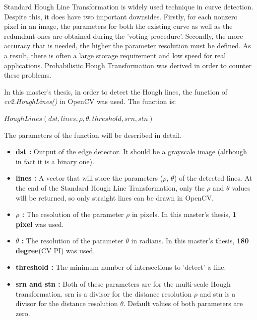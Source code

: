 Standard Hough Line Transformation is widely used technique in curve detection. Despite this, it does have two important downsides. Firstly, for each nonzero pixel in an image, the parameters for both the existing curve as well as the redundant ones are obtained during the 'voting procedure'. Secondly, the more accuracy that is needed, the higher the parameter resolution must be defined. As a result, there is often a large storage requirement and low speed for real applications. Probabilistic Hough Transformation was derived in order to counter these problems. 

In this master's thesis, in order to detect the Hough lines, the function of \textit{cv2.HoughLines()} in OpenCV was used. The function is:

  \begin{center}
  
$HoughLines(dst, lines, \rho, \theta, threshold, srn, stn )  $

  \end{center}

The parameters of the function will be described in detail.\cite{Standard_Hough_Transformation2}
 
\begin{itemize}

\item \textbf{dst : }Output of the edge detector. It should be a grayscale image (although in fact it is a binary one).
 
\item \textbf{lines : }A vector that will store the parameters ($ \rho $, $ \theta $) of the detected lines. At the end of the Standard Hough Line Transformation, only the $ \rho $ and $ \theta $ values will be returned, so only straight lines can be drawn in OpenCV.

\item \textbf{$ \rho $ : }The resolution of the parameter $ \rho $ in pixels. In this master's thesis, \textbf{1 pixel} was used.

\item \textbf{$ \theta $ : }The resolution of the parameter $ \theta $ in radians. In this master's thesis, \textbf{180 degree}(CV$ \_ $PI) was used.

\item \textbf{threshold : }The minimum number of intersections to 'detect' a line.

\item \textbf{srn and stn : }Both of these parameters are for the multi-scale Hough transformation. srn is a divisor for the distance resolution $ \rho $ and stn is a divisor for the distance resolution $ \theta $. Default values of both parameters are zero.

\end{itemize}


